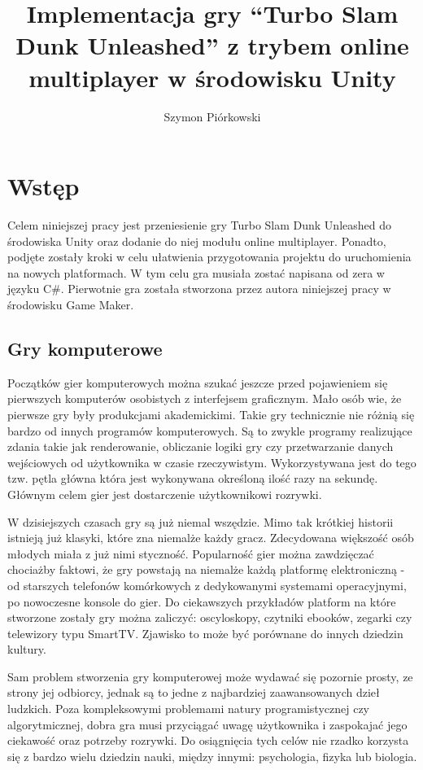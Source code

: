 \documentclass[a4paper,12pt,twoside,openany]{report}
\title{Implementacja gry “Turbo Slam Dunk Unleashed” z trybem online multiplayer w środowisku Unity}
\author{Szymon Piórkowski}
\begin{document}
\maketitle

\chapter{Wstęp}
Celem niniejszej pracy jest przeniesienie gry Turbo Slam Dunk Unleashed do środowiska Unity oraz dodanie do niej modułu online multiplayer. Ponadto, podjęte zostały kroki w celu ułatwienia przygotowania projektu do uruchomienia na nowych platformach. W tym celu gra musiała zostać napisana od zera w języku C\#. Pierwotnie gra została stworzona przez autora niniejszej pracy w środowisku Game Maker.

\section{Gry komputerowe}
Początków gier komputerowych można szukać jeszcze przed pojawieniem się pierwszych komputerów osobistych z interfejsem graficznym. Mało osób wie, że pierwsze gry były produkcjami akademickimi. Takie gry technicznie nie różnią się bardzo od innych programów komputerowych. Są to zwykle programy realizujące zdania takie jak renderowanie, obliczanie logiki gry czy przetwarzanie danych wejściowych od użytkownika w czasie rzeczywistym. Wykorzystywana jest do tego tzw. pętla główna która jest wykonywana określoną ilość razy na sekundę. Głównym celem gier jest dostarczenie użytkownikowi rozrywki.

W dzisiejszych czasach gry są już niemal wszędzie. Mimo tak krótkiej historii istnieją już klasyki, które zna niemalże każdy gracz. Zdecydowana większość osób młodych miała z już nimi styczność. Popularność gier można zawdzięczać chociażby faktowi, że gry powstają na niemalże każdą platformę elektroniczną - od starszych telefonów komórkowych z dedykowanymi systemami operacyjnymi, po nowoczesne konsole do gier. Do ciekawszych przykładów platform na które stworzone zostały gry można zaliczyć: oscyloskopy, czytniki ebooków, zegarki czy telewizory typu SmartTV. Zjawisko to może być porównane do innych dziedzin kultury.

Sam problem stworzenia gry komputerowej może wydawać się pozornie prosty, ze strony jej odbiorcy, jednak są to jedne z najbardziej zaawansowanych dzieł ludzkich. Poza kompleksowymi problemami natury programistycznej czy algorytmicznej, dobra gra musi przyciągać uwagę użytkownika i zaspokajać jego ciekawość oraz potrzeby rozrywki. Do osiągnięcia tych celów nie rzadko korzysta się z bardzo wielu dziedzin nauki, między innymi: psychologia, fizyka lub biologia.
\end{document}

